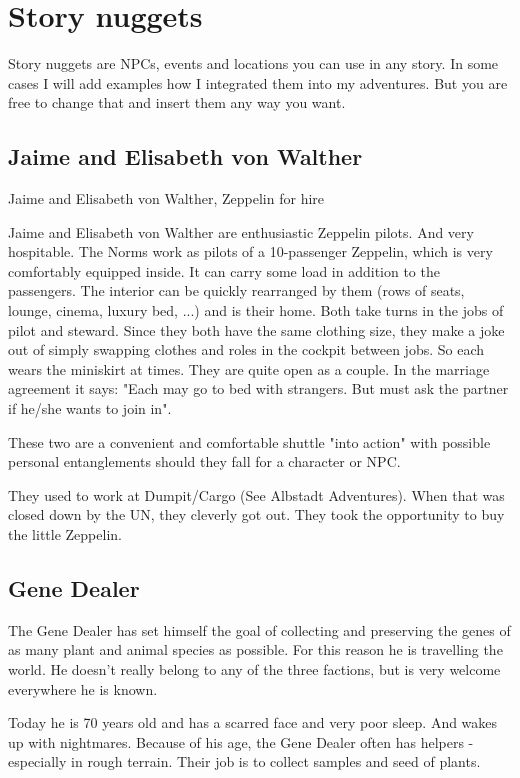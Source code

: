 \chapter{Story nuggets}

Story nuggets are NPCs, events and locations you can use in any story. In some cases I will add examples how I integrated them into my adventures. But you are free to change that and insert them any way you want.

\section{Jaime and Elisabeth von Walther}
\label{sec:Jaime and Elisabeth}

Jaime and Elisabeth von Walther, Zeppelin for hire

Jaime and Elisabeth von Walther are enthusiastic Zeppelin pilots. And very hospitable.
The Norms work as pilots of a 10-passenger Zeppelin, which is very comfortably equipped inside. It can carry some load in addition to the passengers.
The interior can be quickly rearranged by them (rows of seats, lounge, cinema, luxury bed, ...) and is their home.
Both take turns in the jobs of pilot and steward. Since they both have the same clothing size, they make a joke out of simply swapping clothes and roles in the cockpit between jobs. So each wears the miniskirt at times.
They are quite open as a couple. In the marriage agreement it says:
"Each may go to bed with strangers. But must ask the partner if he/she wants to join in".

These two are a convenient and comfortable shuttle "into action" with possible personal entanglements should they fall for a character or NPC.

They used to work at Dumpit/Cargo (See Albstadt Adventures). When that was closed down by the UN, they cleverly got out. They took the opportunity to buy the little Zeppelin.

\section{Gene Dealer}
\label{sec:Gene Dealer}

The Gene Dealer has set himself the goal of collecting and preserving the genes of as many plant and animal species as possible.
For this reason he is travelling the world.
He doesn't really belong to any of the three factions, but is very welcome everywhere he is known.

Today he is 70 years old and has a scarred face and very poor sleep. And wakes up with nightmares.
Because of his age, the Gene Dealer often has helpers - especially in rough terrain. Their job is to collect samples and seed of plants.

